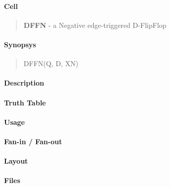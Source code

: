 \label{DFFN}
\paragraph{Cell}
\begin{quote}
    \textbf{DFFN} - a Negative edge-triggered D-FlipFlop
\end{quote}

\paragraph{Synopsys}
\begin{quote}
    DFFN(Q, D, XN)
\end{quote}

\paragraph{Description}

%

\paragraph{Truth Table}
%

\paragraph{Usage}

\paragraph{Fan-in / Fan-out}

\paragraph{Layout}

\paragraph{Files}

